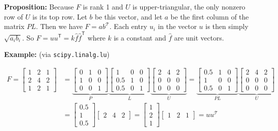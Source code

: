 \documentclass{article}
\begin{document}
\begin{enumerate}[label=(\roman*)]
\textbf{Proposition:} Because $F$ is rank 1 and $U$ is upper-triangular, the only nonzero row of $U$ is its top row. Let $b$ be this vector, and let $a$ be the first column of the matrix $PL$. Then we have $F = ab^\mathcal{T}$. Each entry $u_i$ in the vector $u$ is then simply $\sqrt{a_i b_i}$. So $F=uu^\mathsf{T}= k\hat{f}\hat{f}^\mathsf{T}$ where $k$ is a constant and $\hat{f}$ are unit vectors.

\textbf{Example:} (via \texttt{scipy.linalg.lu})

\begin{equation}
\begin{aligned}
F =
\begin{bmatrix}
1 & 2 & 1 \\
2 & 4 & 2 \\
1 & 2 & 1
\end{bmatrix}
&= 
\underbrace{\begin{bmatrix}
0 & 1 & 0 \\
1 & 0 & 0 \\
0 & 0 & 1
\end{bmatrix}}_{P}
\underbrace{\begin{bmatrix}
1 & 0 & 0 \\
0.5 & 1 & 0 \\
0.5 & 0 & 1
\end{bmatrix}}_{L}
\underbrace{\begin{bmatrix}
2 & 4 & 2 \\
0 & 0 & 0 \\
0 & 0 & 0
\end{bmatrix}}_{U}
=
\underbrace{\begin{bmatrix}
0.5 & 1 & 0 \\
1 & 0 & 0 \\
0.5 & 0 & 1
\end{bmatrix}}_{PL}
\underbrace{\begin{bmatrix}
2 & 4 & 2 \\
0 & 0 & 0 \\
0 & 0 & 0
\end{bmatrix}}_{U} \\
&=
\begin{bmatrix}
0.5 \\
1 \\
0.5 
\end{bmatrix}
\begin{bmatrix}
2 & 4 & 2 
\end{bmatrix}
=
\begin{bmatrix}
1 \\
2 \\
1 
\end{bmatrix}
\begin{bmatrix}
1 & 2 & 1 
\end{bmatrix}
= uu^\mathcal{T}
\end{aligned}
\end{equation}


\end{enumerate}
\end{document}
